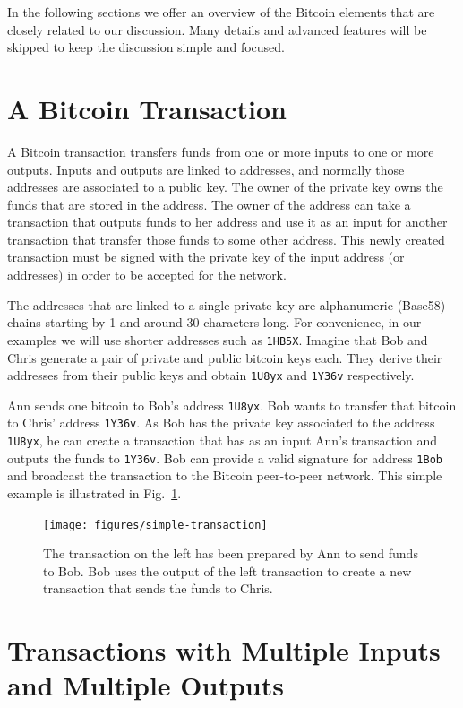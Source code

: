 \documentclass[journal]{IEEEtran}
\begin{document}
In the following sections we offer an overview of the Bitcoin elements that are closely related to our discussion.
Many details and advanced features will be skipped to keep the discussion simple and focused.

\section{A Bitcoin Transaction}
A Bitcoin transaction transfers funds from one or more inputs to one or more outputs.
Inputs and outputs are linked to addresses, and normally those addresses are associated to a public key.
The owner of the private key owns the funds that are stored in the address.
The owner of the address can take a transaction that outputs funds to her address and use it as an input for another transaction that transfer those funds to some other address.
This newly created transaction must be signed with the private key of the input address (or addresses) in order to be accepted for the network.

The addresses that are linked to a single private key are alphanumeric (Base58) chains starting by 1 and around 30 characters long.
For convenience, in our examples we will use shorter addresses such as \texttt{1HB5X}.
Imagine that Bob and Chris generate a pair of private and public bitcoin keys each.
They derive their addresses from their public keys and obtain \texttt{1U8yx} and \texttt{1Y36v} respectively.

Ann sends one bitcoin to Bob's address \texttt{1U8yx}.
Bob wants to transfer that bitcoin to Chris' address \texttt{1Y36v}.
As Bob has the private key associated to the address \texttt{1U8yx}, he can create a transaction that has as an input Ann's transaction and outputs the funds to \texttt{1Y36v}.
Bob can provide a valid signature for address \texttt{1Bob} and broadcast the transaction to the Bitcoin peer-to-peer network.
This simple example is illustrated in Fig.~\ref{fig:simple-transaction}.

\begin{figure}[!t]
\centering
\texttt{[image: figures/simple-transaction]}
\caption{The transaction on the left has been prepared by Ann to send funds to Bob. Bob uses the output of the left transaction to create a new transaction that sends the funds to Chris.}
\label{fig:simple-transaction}
\end{figure}

\section{Transactions with Multiple Inputs and Multiple Outputs}
\end{document}
